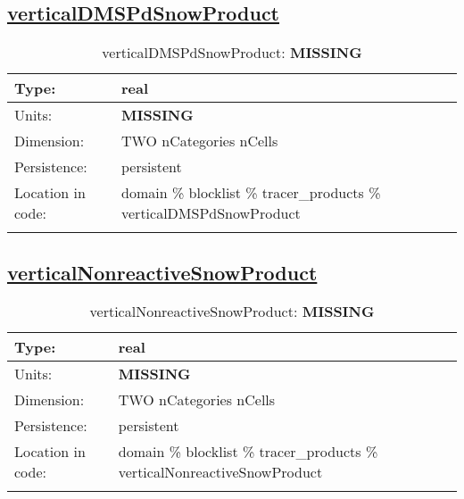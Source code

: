 \subsection[verticalDMSPdSnowProduct]{\hyperref[sec:var_tab_tracer_products]{verticalDMSPdSnowProduct}}
\label{subsec:var_sec_tracer_products_verticalDMSPdSnowProduct}
\begin{center}
\begin{longtable}{| p{2.0in} | p{4.0in} |}
        \hline 
        Type: & real \\
        \hline 
        Units: & {\bf \color{red} MISSING} \\
        \hline 
        Dimension: & TWO nCategories nCells \\
        \hline 
        Persistence: & persistent \\
        \hline 
         Location in code: & domain \% blocklist \% tracer\_products \% verticalDMSPdSnowProduct \\
         \hline 
    \caption{verticalDMSPdSnowProduct: {\bf \color{red} MISSING}}
\end{longtable}
\end{center}
\subsection[verticalNonreactiveSnowProduct]{\hyperref[sec:var_tab_tracer_products]{verticalNonreactiveSnowProduct}}
\label{subsec:var_sec_tracer_products_verticalNonreactiveSnowProduct}
\begin{center}
\begin{longtable}{| p{2.0in} | p{4.0in} |}
        \hline 
        Type: & real \\
        \hline 
        Units: & {\bf \color{red} MISSING} \\
        \hline 
        Dimension: & TWO nCategories nCells \\
        \hline 
        Persistence: & persistent \\
        \hline 
         Location in code: & domain \% blocklist \% tracer\_products \% verticalNonreactiveSnowProduct \\
         \hline 
    \caption{verticalNonreactiveSnowProduct: {\bf \color{red} MISSING}}
\end{longtable}
\end{center}
